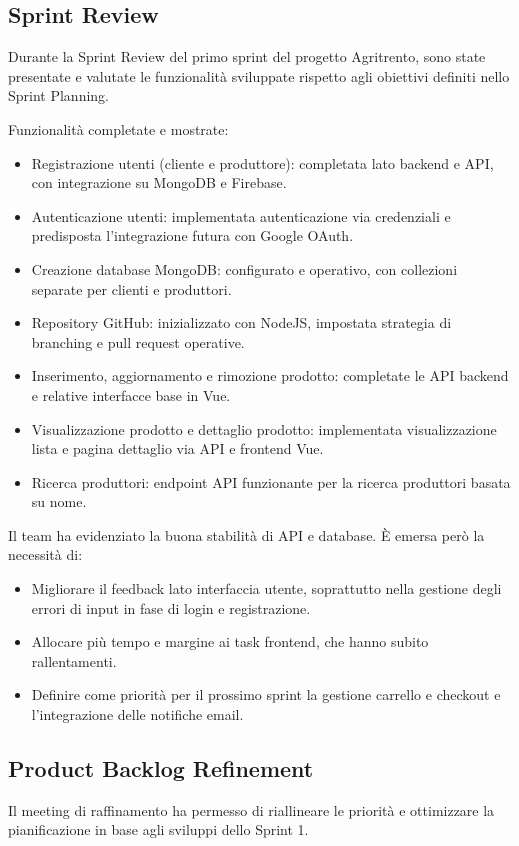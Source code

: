 \subsection{Sprint Review}

Durante la Sprint Review del primo sprint del progetto Agritrento, sono state presentate e valutate le funzionalità sviluppate rispetto agli obiettivi definiti nello Sprint Planning.

Funzionalità completate e mostrate:
\begin{itemize}
    \item Registrazione utenti (cliente e produttore): completata lato backend e API, con integrazione su MongoDB e Firebase.
    \item Autenticazione utenti: implementata autenticazione via credenziali e predisposta l’integrazione futura con Google OAuth.
    \item Creazione database MongoDB: configurato e operativo, con collezioni separate per clienti e produttori.
    \item Repository GitHub: inizializzato con NodeJS, impostata strategia di branching e pull request operative.
    \item Inserimento, aggiornamento e rimozione prodotto: completate le API backend e relative interfacce base in Vue.
    \item Visualizzazione prodotto e dettaglio prodotto: implementata visualizzazione lista e pagina dettaglio via API e frontend Vue.
    \item Ricerca produttori: endpoint API funzionante per la ricerca produttori basata su nome.
\end{itemize}

Il team ha evidenziato la buona stabilità di API e database. È emersa però la necessità di:
\begin{itemize}
    \item Migliorare il feedback lato interfaccia utente, soprattutto nella gestione degli errori di input in fase di login e registrazione.
    \item Allocare più tempo e margine ai task frontend, che hanno subito rallentamenti.
    \item Definire come priorità per il prossimo sprint la gestione carrello e checkout e l’integrazione delle notifiche email.
\end{itemize}

\vspace{0.5cm}

\subsection*{Product Backlog Refinement}
Il meeting di raffinamento ha permesso di riallineare le priorità e ottimizzare la pianificazione in base agli sviluppi dello Sprint 1.

